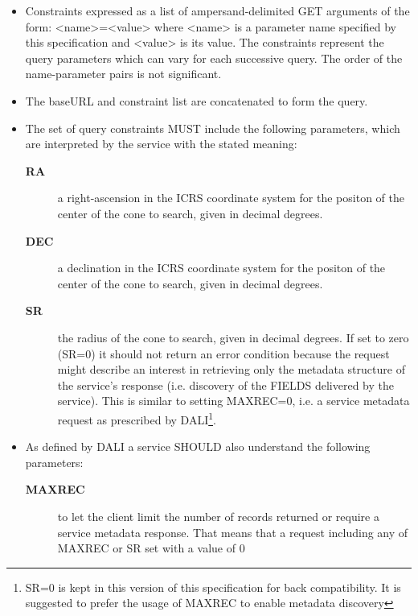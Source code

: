 \documentclass[11pt,a4paper]{ivoa}
\begin{document}
\begin{itemize}
		\item Constraints expressed as a list of
			ampersand-delimited GET arguments of the form: <name>=<value> where
			<name> is a parameter name specified by this specification and <value>
			is its value. The constraints represent the query parameters which can
			vary for each successive query. The order of the name-parameter pairs is
			not significant.
		\item The baseURL and constraint list are concatenated
			to form the query. 
		\item The set of query constraints MUST include the
			following parameters, which are interpreted by the service with the
			stated meaning: 
			\begin{description}
				\item[\textbf{RA}] a right-ascension
					in the ICRS coordinate system for the positon of the center of the cone
					to search, given in decimal degrees.
				\item[\textbf{DEC}] a declination
					in the ICRS coordinate system for the positon of the center of the cone
					to search, given in decimal degrees.
				\item[\textbf{SR}] the radius of the cone to search, given in decimal degrees.
					If set to zero (SR=0) it should not return an error condition because the
					request might describe an interest in retrieving only the metadata structure
					of the service's response (i.e. discovery of the FIELDS delivered by the service).
					This is similar to setting MAXREC=0, i.e. a service metadata request as prescribed
					by DALI\footnote{SR=0 is kept in this version of this specification for back
					compatibility. It is suggested to prefer the usage of MAXREC to enable metadata
					discovery}\citep{2017ivoa.spec.0517D}.
			\end{description}
		\item As defined by DALI a service SHOULD also understand the following parameters:
			\begin{description}
				\item[\textbf{MAXREC}] to let the client limit the number of records returned
					or require a service metadata response. That means that a
					request including any of MAXREC or SR set with a value of 0 

\end{description}
\end{itemize}
\end{document}
